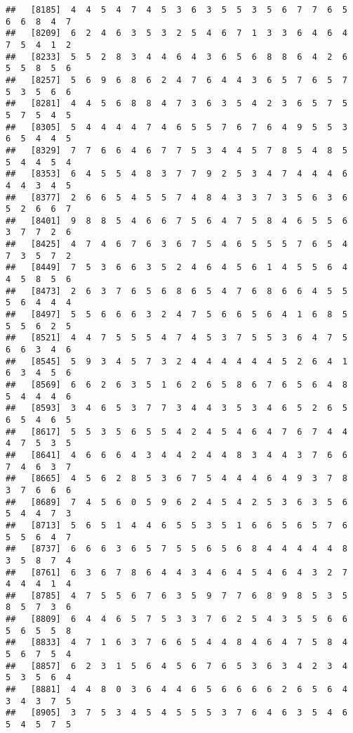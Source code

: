 \documentclass[
]{book}
\begin{document}
\begin{verbatim}
##   [8185]  4  4  5  4  7  4  5  3  6  3  5  5  3  5  6  7  7  6  5  6  6  8  4  7
##   [8209]  6  2  4  6  3  5  3  2  5  4  6  7  1  3  3  6  4  6  4  7  5  4  1  2
##   [8233]  5  5  2  8  3  4  4  6  4  3  6  5  6  8  8  6  4  2  6  5  5  8  5  6
##   [8257]  5  6  9  6  8  6  2  4  7  6  4  4  3  6  5  7  6  5  7  5  3  5  6  6
##   [8281]  4  4  5  6  8  8  4  7  3  6  3  5  4  2  3  6  5  7  5  5  7  5  4  5
##   [8305]  5  4  4  4  4  7  4  6  5  5  7  6  7  6  4  9  5  5  3  6  5  4  4  5
##   [8329]  7  7  6  6  4  6  7  7  5  3  4  4  5  7  8  5  4  8  5  5  4  4  5  4
##   [8353]  6  4  5  5  4  8  3  7  7  9  2  5  3  4  7  4  4  4  6  4  4  3  4  5
##   [8377]  2  6  6  5  4  5  5  7  4  8  4  3  3  7  3  5  6  3  6  5  2  6  6  7
##   [8401]  9  8  8  5  4  6  6  7  5  6  4  7  5  8  4  6  5  5  6  3  7  7  2  6
##   [8425]  4  7  4  6  7  6  3  6  7  5  4  6  5  5  5  7  6  5  4  7  3  5  7  2
##   [8449]  7  5  3  6  6  3  5  2  4  6  4  5  6  1  4  5  5  6  4  4  5  8  5  6
##   [8473]  2  6  3  7  6  5  6  8  6  5  4  7  6  8  6  6  4  5  5  5  6  4  4  4
##   [8497]  5  5  6  6  6  3  2  4  7  5  6  6  5  6  4  1  6  8  5  5  5  6  2  5
##   [8521]  4  4  7  5  5  5  4  7  4  5  3  7  5  5  3  6  4  7  5  6  6  3  4  6
##   [8545]  5  9  3  4  5  7  3  2  4  4  4  4  4  4  5  2  6  4  1  6  3  4  5  6
##   [8569]  6  6  2  6  3  5  1  6  2  6  5  8  6  7  6  5  6  4  8  5  4  4  4  6
##   [8593]  3  4  6  5  3  7  7  3  4  4  3  5  3  4  6  5  2  6  5  6  5  4  6  5
##   [8617]  5  5  3  5  6  5  5  4  2  4  5  4  6  4  7  6  7  4  4  4  7  5  3  5
##   [8641]  4  6  6  6  4  3  4  4  2  4  4  8  3  4  4  3  7  6  6  7  4  6  3  7
##   [8665]  4  5  6  2  8  5  3  6  7  5  4  4  4  6  4  9  3  7  8  3  7  6  6  6
##   [8689]  7  4  5  6  0  5  9  6  2  4  5  4  2  5  3  6  3  5  6  5  4  4  7  3
##   [8713]  5  6  5  1  4  4  6  5  5  3  5  1  6  6  5  6  5  7  6  5  5  6  4  7
##   [8737]  6  6  6  3  6  5  7  5  5  6  5  6  8  4  4  4  4  4  8  3  5  8  7  4
##   [8761]  6  3  6  7  8  6  4  4  3  4  6  4  5  4  6  4  3  2  7  4  4  4  1  4
##   [8785]  4  7  5  5  6  7  6  3  5  9  7  7  6  8  9  8  5  3  5  8  5  7  3  6
##   [8809]  6  4  4  6  5  7  5  3  3  7  6  2  5  4  3  5  5  6  6  5  6  5  5  8
##   [8833]  4  7  1  6  3  7  6  6  5  4  4  8  4  6  4  7  5  8  4  5  6  7  5  4
##   [8857]  6  2  3  1  5  6  4  5  6  7  6  5  3  6  3  4  2  3  4  5  3  5  6  4
##   [8881]  4  4  8  0  3  6  4  4  6  5  6  6  6  6  2  6  5  6  4  3  4  3  7  5
##   [8905]  3  7  5  3  4  5  4  5  5  5  3  7  6  4  6  3  5  4  6  5  4  5  7  5

\end{verbatim}
\end{document}
